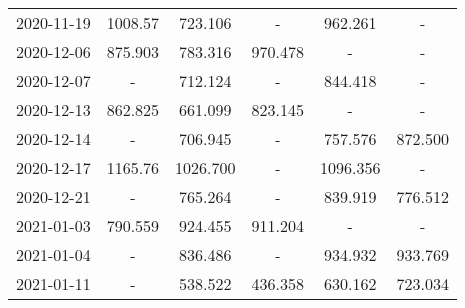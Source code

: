 \begin{table*}[t]
\begin{tabular}{cccccc}
2020-11-19 &                        1008.57 &   {\cellcolor{blue!25} 723.106} &                              - &         962.261 &                  - \\
2020-12-06 &                        875.903 &   {\cellcolor{blue!25} 783.316} &                        970.478 &               - &                  - \\
2020-12-07 &                              - &   {\cellcolor{blue!25} 712.124} &                              - &         844.418 &                  - \\
2020-12-13 &                        862.825 &   {\cellcolor{blue!25} 661.099} &                        823.145 &               - &                  - \\
2020-12-14 &                              - &   {\cellcolor{blue!25} 706.945} &                              - &         757.576 &            872.500 \\
2020-12-17 &                        1165.76 &  {\cellcolor{blue!25} 1026.700} &                              - &        1096.356 &                  - \\
2020-12-21 &                              - &   {\cellcolor{blue!25} 765.264} &                              - &         839.919 &            776.512 \\
2021-01-03 &  {\cellcolor{blue!25} 790.559} &                         924.455 &                        911.204 &               - &                  - \\
2021-01-04 &                              - &   {\cellcolor{blue!25} 836.486} &                              - &         934.932 &            933.769 \\
2021-01-11 &                              - &                         538.522 &  {\cellcolor{blue!25} 436.358} &         630.162 &            723.034 \\
\bottomrule
\end{tabular}

\end{table*}

